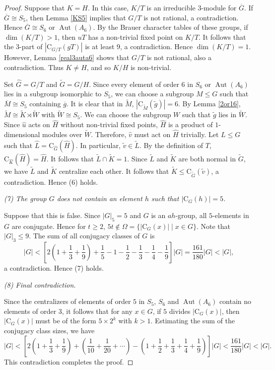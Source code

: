\documentclass[11pt]{article}
\providecommand{\C}{{\mathrm{C}}}
\providecommand{\Aut}{{\operatorname{Aut}}}
\providecommand{\olg}{{\overline{g}}}
\providecommand{\olM}{{\overline{M}}}
\providecommand{\wtg}{{\widetilde{g}}}
\providecommand{\wtv}{{\widetilde{v}}}
\providecommand{\wtG}{{\widetilde{G}}}
\providecommand{\wtK}{{\widetilde{K}}}
\providecommand{\wtL}{{\widetilde{L}}}
\providecommand{\wtM}{{\widetilde{M}}}
\providecommand{\wtW}{{\widetilde{W}}}
\providecommand{\whu}{{\widehat{u}}}
\providecommand{\whv}{{\widehat{v}}}
\providecommand{\whG}{{\widehat{G}}}
\providecommand{\whH}{{\widehat{H}}}
\providecommand{\whK}{{\widehat{K}}}
\providecommand{\whL}{{\widehat{L}}}
\begin{document}
\begin{proof}
    Suppose that $K=H$. In this case, $K/T$ is an irreducible $3$-module for $\overline G$.
    If $\overline G\cong S_5$, then Lemma \ref{KS5} implies that $G/T$ is not rational, a contradiction. 
    Hence $\overline G\cong S_6$ or $\Aut(A_6)$.
    By the Brauer character tables of these groups, if $\dim(K/T)>1$, then $uT$ has a non-trivial fixed point on $K/T$. 
    It follows that the $3$-part of $|\C_{G/T}(gT)|$ is at least $9$, a contradiction.
    Hence $\dim(K/T)=1$.
    However, Lemma \ref{real3auta6} shows that $G/T$ is not rational, also a contradiction. 
    Thus $K\neq H$, and so $K/H$ is non-trivial.

    
    Set $\whG=G/T$ and $\wtG=G/H$.
    Since every element of order $6$ in $S_6$ or $\Aut(A_6)$ lies in a subgroup isomorphic to $S_5$, 
    we can choose a subgroup $M \leq G$ such that $\olM \cong S_5$ containing $\olg$.
    It is clear that in $\wtM$, $|\C_{\wtM}(\wtg)|=6$.
    By Lemma \ref{2or16}, $\wtM\cong \wtK \rtimes \wtW$ with $\wtW\cong S_5$.
    We can choose the subgroup $W$ such that $\wtg$ lies in $\wtW$.
    Since $\whu$ acts on $\whH$ without non-trivial fixed points, 
    $\whH$ is a product of $1$-dimensional modules over $\wtW$.
    Therefore, $\whv$ must act on $\whH$ trivially.
    Let $L\leq G$ such that $\whL=\C_{\whG}(\whH)$.
    In particular, $\wtv\in \wtL$.
    By the definition of $T$, $\C_{\whK}(\whH)=\whH$.
    It follows that $\wtL\cap \wtK=1$.
    Since $\wtL$ and $\wtK$ are both normal in $\wtG$, 
    we have $\wtL$ and $\wtK$ centralize each other.
    It follows that $\wtK\leq \C_{\wtG}(\wtv)$, a contradiction.
    Hence (6) holds.



\medskip
{\sl (7) The group $G$ does not contain an element $h$ such that $|\C_G(h)|=5$. } 

    Suppose that this is false. 
    Since $|G|_5=5$ and $G$ is an $ah$-group,
    all $5$-elements in $G$ are conjugate.
    Hence for $t\geq 2$, $5t\notin \Omega = \{|\C_G(x)| \mid x\in G\}$.
    Note that $|G|_3\leq 9$.
    The sum of all conjugacy classes of $G$ is
    $$|G| < [2(1+\frac{1}{3} + \frac{1}{9})+\frac{1}{5} - 1 - \frac{1}{2} - \frac{1}{3} - \frac{1}{4} - \frac{1}{9}]|G| = \frac{161}{180} |G| < |G|, $$ 
    a contradiction. 
    Hence (7) holds.
    
\medskip
{\sl (8) Final contradiction.}

    Since the centralizers of elements of order $5$ in $S_5$, $S_6$ and $\Aut(A_6)$ contain no  elements of order $3$, 
    it follows that for any $x\in G$, if $5$ divides $|\C_G(x)|$,
    then $|\C_G(x)|$ must be of the form $5\times 2^k$ with $k>1$.
    Estimating the sum of the conjugacy class sizes, we have 
    $$ |G| < [2(1+\dfrac{1}{3}+\dfrac{1}{9}) + (\dfrac{1}{10} + \dfrac{1}{20} + \cdots )
    - (1 + \dfrac{1}{2} +\dfrac{1}{3}+\dfrac{1}{4} +\dfrac{1}{9})]|G|<\dfrac{161}{180}|G|<|G|. $$
    This contradiction completes the proof.
\end{proof}
\end{document}
